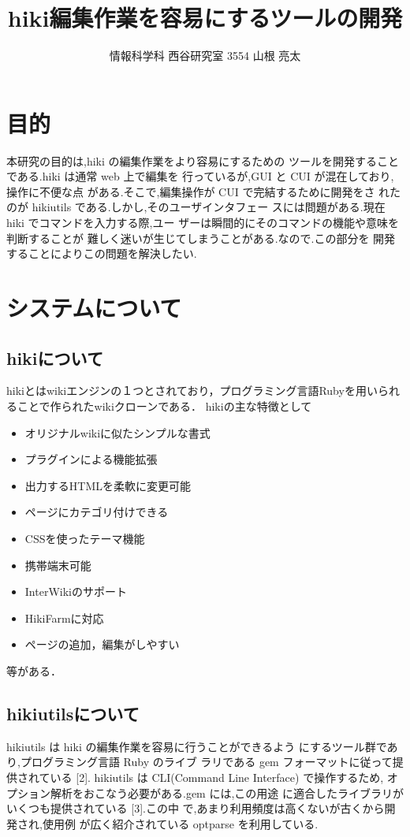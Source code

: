 \documentclass[a4j,twocolumn]{jsarticle}
\begin{document}
\title{hiki編集作業を容易にするツールの開発}
\author{情報科学科 西谷研究室 3554 山根 亮太}
\date{}
\maketitle
\section{目的}
本研究の目的は,hiki の編集作業をより容易にするための ツールを開発することである.hiki は通常 web 上で編集を 行っているが,GUI と CUI が混在しており,操作に不便な点 がある.そこで,編集操作が CUI で完結するために開発をさ れたのが hikiutils である.しかし,そのユーザインタフェー スには問題がある.現在 hiki でコマンドを入力する際,ユー ザーは瞬間的にそのコマンドの機能や意味を判断することが 難しく迷いが生じてしまうことがある.なので.この部分を 開発することによりこの問題を解決したい.

\section{システムについて}
\subsection{hikiについて}
hikiとはwikiエンジンの１つとされており，プログラミング言語Rubyを用いられることで作られたwikiクローンである．
hikiの主な特徴として
\begin{itemize}
\item オリジナルwikiに似たシンプルな書式
\item プラグインによる機能拡張
\item 出力するHTMLを柔軟に変更可能
\item ページにカテゴリ付けできる
\item CSSを使ったテーマ機能
\item 携帯端末可能
\item InterWikiのサポート
\item HikiFarmに対応
\item ページの追加，編集がしやすい
\end{itemize}
等がある\cite{hiki}．

\subsection{hikiutilsについて}
hikiutils は hiki の編集作業を容易に行うことができるよう にするツール群であり,プログラミング言語 Ruby のライブ ラリである gem フォーマットに従って提供されている [2]. hikiutils は CLI(Command Line Interface) で操作するため, オプション解析をおこなう必要がある.gem には,この用途 に適合したライブラリがいくつも提供されている [3].この中 で,あまり利用頻度は高くないが古くから開発され,使用例 が広く紹介されている optparse を利用している.
\end{document}
